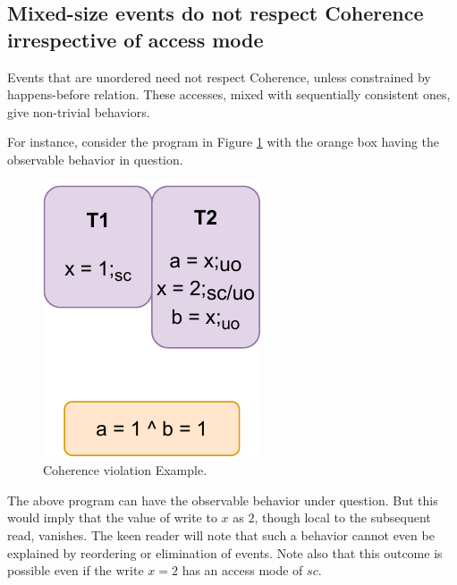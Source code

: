     \subsection{Mixed-size events do not respect Coherence irrespective of access mode}

        Events that are unordered need not respect Coherence, unless constrained by happens-before relation.
        These accesses, mixed with sequentially consistent ones, give non-trivial behaviors.

        For instance, consider the program in Figure \ref{crit:coherence} with the orange box having the observable behavior in question.
        \begin{figure}[H]
            \centering
            \includegraphics[scale=0.7]{7.ConclusionFutureWork/CoherenceNormal.pdf}
            \caption{Coherence violation Example.}
            \label{crit:coherence}
        \end{figure}

        The above program can have the observable behavior under question.
        But this would imply that the value of write to $x$ as $2$, though local to the subsequent read, vanishes. 
        The keen reader will note that such a behavior cannot even be explained by reordering or elimination of events.
        Note also that this outcome is possible even if the write $x=2$ has an access mode of $sc$. 

